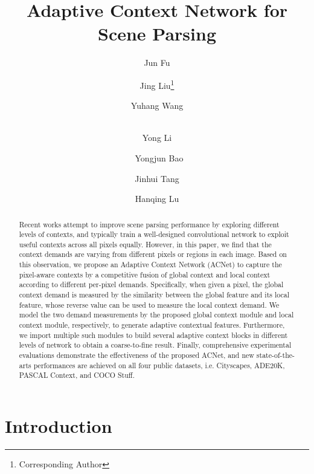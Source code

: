 \documentclass[10pt,twocolumn,letterpaper]{article}
\begin{document}
\title{Adaptive Context Network for Scene Parsing}
\author[ ]{
Jun Fu
}
\author[]{
\; Jing Liu\thanks{Corresponding Author}
}
\author[]{
\; Yuhang Wang  
}

\author[]{
\\ Yong Li 
}

\author[]{
\ Yongjun Bao
}
\author[]{
\;Jinhui Tang
}
\author[]{
\;Hanqing Lu
}

\renewcommand\Authsep{  } 
\renewcommand\Authands{  }

\maketitle
\thispagestyle{empty}
\begin{abstract}
   Recent works attempt to improve scene parsing performance by exploring different levels of contexts, and typically train a well-designed convolutional network to exploit useful contexts across all pixels equally. However, in this paper, we find that the context demands are varying from different pixels or regions in each image. Based on this observation, we propose an Adaptive Context Network (ACNet) to capture the pixel-aware contexts by a competitive fusion of global context and local context according to different per-pixel demands. Specifically, when given a pixel, the global context demand is measured by the similarity between the global feature and its local feature, whose reverse value can be used to measure the local context demand. We model  the two demand measurements by the proposed global context module and local context module, respectively, to generate adaptive contextual features. Furthermore, we  import multiple such modules to build several adaptive context blocks in  different levels of network to obtain a coarse-to-fine result.  Finally, comprehensive experimental evaluations demonstrate the effectiveness of the proposed ACNet, and new state-of-the-arts performances are achieved on all four public datasets, i.e. Cityscapes, ADE20K, PASCAL Context, and COCO Stuff.
\end{abstract}

\section{Introduction}
\end{document}
